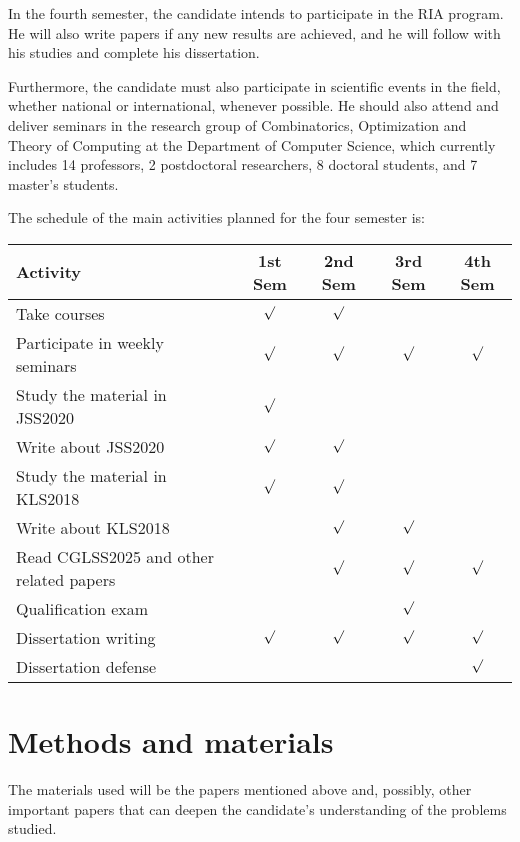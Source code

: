 \documentclass[12pt]{article}
\begin{document}
In the fourth semester, the candidate intends to participate in the RIA program.
He will also write papers if any new results are achieved, and he will follow with his studies and complete his dissertation.

Furthermore, the candidate must also participate in scientific events in the field, whether national or international, 
whenever possible. He should also attend and deliver seminars in the research group of Combinatorics, Optimization and Theory of Computing at the Department of Computer Science, which currently includes 14 professors, 
2 postdoctoral researchers, 8 doctoral students, and 7 master's students.

The schedule of the main activities planned for the four semester is:

\begin{center}
{\footnotesize
\begin{tabular}{|l|c|c|c|c|}
\hline
\textbf{Activity} & \textbf{1st Sem} & \textbf{2nd Sem} & \textbf{3rd Sem} & \textbf{4th Sem} \\
\hline
Take courses                   & \(\surd\) & \(\surd\) &           &           \\
Participate in weekly seminars & \(\surd\) & \(\surd\) & \(\surd\) & \(\surd\) \\
Study the material in JSS2020  & \(\surd\) &           &           &           \\
Write about JSS2020            & \(\surd\) & \(\surd\) &           &           \\
Study the material in KLS2018  & \(\surd\) & \(\surd\) &           &           \\
Write about KLS2018            &           & \(\surd\) & \(\surd\) &           \\
Read CGLSS2025 and other related papers &  & \(\surd\) & \(\surd\) & \(\surd\) \\
Qualification exam            &            &           & \(\surd\) &           \\
Dissertation writing          & \(\surd\)  & \(\surd\) & \(\surd\) & \(\surd\) \\
Dissertation defense          &            &           &           & \(\surd\) \\
\hline
\end{tabular}
}
\end{center}


\section{Methods and materials}
The materials used will be the papers mentioned above and, possibly, other important papers that can deepen the candidate's understanding of the problems studied.
\end{document}
